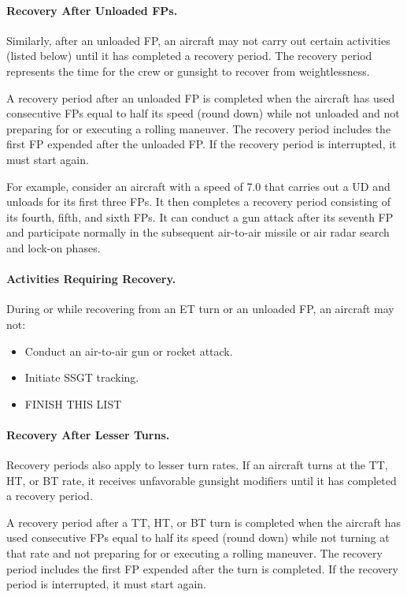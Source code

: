 {\paragraph{Recovery After Unloaded FPs.} Similarly, after an unloaded FP, an aircraft may not carry out certain activities (listed below) until it has completed a recovery period. The recovery period represents the time for the crew or gunsight to recover from weightlessness.

A recovery period after an unloaded FP is completed when the aircraft has used consecutive FPs equal to half its speed (round down) while not unloaded and not preparing for or executing a rolling maneuver. The recovery period includes the first FP expended after the unloaded FP. If the recovery period is interrupted, it must start again.

For example, consider an aircraft with a speed of 7.0 that carries out a UD and unloads for its first three FPs. It then completes a recovery period consisting of its fourth, fifth, and sixth FPs. It can conduct a gun attack after its seventh FP and participate normally in the subsequent air-to-air missile or air radar search and lock-on phases.

\paragraph{Activities Requiring Recovery.}
During or while recovering from an ET turn or an unloaded FP, an aircraft may not:
\begin{itemize}
    \item Conduct an air-to-air gun or rocket attack.
    \item Initiate SSGT tracking.
    \item FINISH THIS LIST
\end{itemize}

\paragraph{Recovery After Lesser Turns.} Recovery periods also apply to lesser turn rates. If an aircraft turns at the TT, HT, or BT rate, it receives unfavorable gunsight modifiers until it has completed a recovery period.

A recovery period after a TT, HT, or BT turn is completed when the aircraft has used consecutive FPs equal to half its speed (round down) while not turning at that rate and not preparing for or executing a rolling maneuver. The recovery period includes the first FP expended after the turn is completed. If the recovery period is interrupted, it must start again.

}

